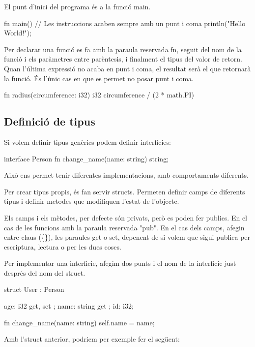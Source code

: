 ﻿\documentclass{article}
\begin{document}
El punt d'inici del programa és a la funció main.

\begin{code}
fn main() {
    // Les instruccions acaben sempre amb un punt i coma
    println("Hello World!");
}
\end{code}

Per declarar una funció es fa amb la paraula reservada fn, seguit del nom de la 
funció i els paràmetres entre parèntesis, i finalment el tipus del valor de retorn.
Quan l'última expressió no acaba en punt i coma, el resultat serà el que retornarà
la funció. És l'únic cas en que es permet no posar punt i coma.

\begin{code}
fn radius(circumference: i32) i32 {
    circumference / (2 * math.PI)
}
\end{code}

\subsection{Definició de tipus}

Si volem definir tipus genèrics podem definir interficies:

\begin{code}
interface Person {
    fn change_name(name: string) string;
}
\end{code}

Això ens permet tenir diferentes implementacions, amb comportaments diferents.

Per crear tipus propis, és fan servir structs. Permeten definir camps de diferents
tipus i definir metodes que modifiquen l'estat de l'objecte. 

Els camps i els mètodes, per defecte són privats, però es poden fer publics.
En el cas de les funcions amb la paraula reservada "pub". En el cas dels camps,
afegin entre claus (\{\}), les paraules get o set, depenent de si volem que sigui publica
per escriptura, lectura o per les dues coses.

Per implementar una interficie, afegim dos punts i el nom de la interficie just 
després del nom del struct.

\begin{code}
struct User : Person {
    age: i32 { get, set };
    name: string { get };
    id: i32;

    fn change_name(name: string) {
        self.name = name;
    }
}
\end{code}

Amb l'struct anterior, podriem per exemple fer el següent:
\end{document}
